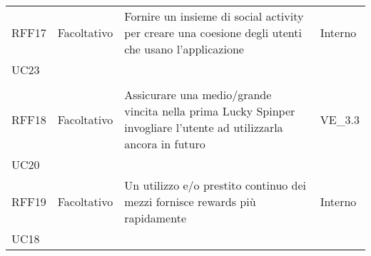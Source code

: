 \begin{longtable}{ >{\centering}p{} >{\centering}p{}
		>{\raggedright}p{} >{\centering}p{}}
	\tabularnewline
	RFF17	&	Facoltativo	&	Fornire un insieme di social activity per creare una coesione degli utenti che usano l'applicazione &	Interno\\
	UC23\\ 	\tabularnewline
	RFF18	&	Facoltativo	& Assicurare una medio/grande vincita nella prima Lucky Spin\glosp per invogliare l'utente ad utilizzarla ancora in futuro &	VE\_3.3\\
	UC20   	\tabularnewline
	RFF19	&	Facoltativo	& Un utilizzo e/o prestito continuo dei mezzi fornisce rewards più rapidamente &	Interno\\UC18
\end{longtable}

